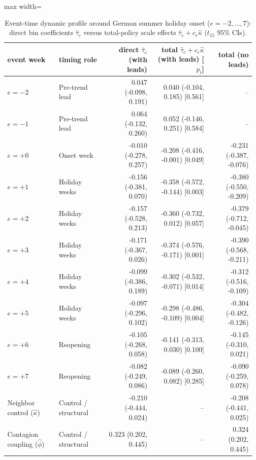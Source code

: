 \begin{table}[!t]
\centering
\caption{Event-time dynamic profile around German summer holiday onset ($e = -2, \dots, 7$): direct bin coefficients $\hat\tau_e$ versus total-policy scale effects $\hat\tau_e + c_e\hat\kappa$ ($t_{15}$ 95\% CIs).}
\label{tab:rev-event}
\footnotesize
\setlength{\tabcolsep}{3.5pt}
\begin{adjustbox}{max width=\linewidth}
\begin{tabular}{llrrr}
\toprule
event week & timing role & direct $\hat\tau_e$ (with leads) & total $\hat\tau_e + c_e\hat\kappa$ (with leads) [$p_t$] & total (no leads) \\
\midrule
$e = -2$ & Pre-trend lead & 0.047 (-0.098, 0.191) & 0.040 (-0.104, 0.185) [0.561] & -- \\
$e = -1$ & Pre-trend lead & 0.064 (-0.132, 0.260) & 0.052 (-0.146, 0.251) [0.584] & -- \\
$e = +0$ & Onset week & -0.010 (-0.278, 0.257) & -0.208 (-0.416, -0.001) [0.049] & -0.231 (-0.387, -0.076) \\
$e = +1$ & Holiday weeks & -0.156 (-0.381, 0.070) & -0.358 (-0.572, -0.144) [0.003] & -0.380 (-0.550, -0.209) \\
$e = +2$ & Holiday weeks & -0.157 (-0.528, 0.213) & -0.360 (-0.732, 0.012) [0.057] & -0.379 (-0.712, -0.045) \\
$e = +3$ & Holiday weeks & -0.171 (-0.367, 0.026) & -0.374 (-0.576, -0.171) [0.001] & -0.390 (-0.568, -0.211) \\
$e = +4$ & Holiday weeks & -0.099 (-0.386, 0.189) & -0.302 (-0.532, -0.071) [0.014] & -0.312 (-0.516, -0.109) \\
$e = +5$ & Holiday weeks & -0.097 (-0.296, 0.102) & -0.298 (-0.486, -0.109) [0.004] & -0.304 (-0.482, -0.126) \\
$e = +6$ & Reopening & -0.105 (-0.268, 0.058) & -0.141 (-0.313, 0.030) [0.100] & -0.145 (-0.310, 0.021) \\
$e = +7$ & Reopening & -0.082 (-0.249, 0.086) & -0.089 (-0.260, 0.082) [0.285] & -0.090 (-0.259, 0.078) \\
Neighbor control ($\hat\kappa$) & Control / structural & -0.210 (-0.444, 0.024) & -- & -0.208 (-0.441, 0.025) \\
Contagion coupling ($\hat\phi$) & Control / structural & 0.323 (0.202, 0.445) & -- & 0.324 (0.202, 0.445) \\
\bottomrule
\end{tabular}
\end{adjustbox}

\end{table}
